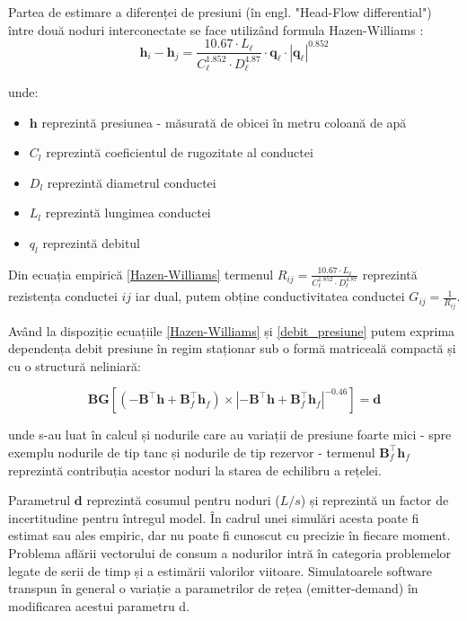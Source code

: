 Partea de estimare a diferenței de presiuni (în engl. "Head-Flow differential") între două noduri interconectate se face utilizând formula Hazen-Williams \cite{sanz2016demand}:
\begin{equation}
\label{debit_presiune}
\mathbf h_i-\mathbf h_j=\frac{10.67\cdot L_\ell}{C_\ell^{1.852}\cdot D_\ell^{4.87}}\cdot \mathbf q_\ell\cdot |\mathbf q_\ell|^{0.852}
\end{equation}

unde:
\begin{itemize}
\label{Hazen-Williams}
\item $\textbf{h}$ reprezintă presiunea - măsurată de obicei în metru coloană de apă
\item $C_l$  reprezintă coeficientul de rugozitate al conductei
\item $D_l$ reprezintă diametrul conductei
\item $L_l$ reprezintă lungimea conductei
\item $q_l$ reprezintă debitul
\end{itemize}

Din ecuația empirică \eqref{Hazen-Williams} termenul $R_{ij}=\frac{10.67\cdot L_\ell}{C_\ell^{1.852}\cdot D_\ell^{4.87}}$ reprezintă rezistența conductei $ij$ iar dual, putem obține conductivitatea conductei $G_{ij} = \frac{1}{R_{ij}}$.

Având la dispoziție ecuațiile \eqref{Hazen-Williams} și \eqref{debit_presiune} putem exprima dependența debit presiune în regim staționar sub o formă matriceală compactă și cu o structură neliniară:

\begin{equation}
\label{eq:HW-matrix}
\mathbf B\mathbf G\left[\left(-\mathbf B^\top \mathbf h+\mathbf B_f^\top \mathbf h_f\right)\times \left|-\mathbf B^\top \mathbf h+\mathbf B_f^\top \mathbf h_f\right|^{-0.46}\right]=\mathbf d
\end{equation}


\noindent unde s-au luat în calcul și nodurile care au variații de presiune foarte mici - spre exemplu nodurile de tip tanc și  nodurile de tip rezervor - termenul $\mathbf B_f^\top \mathbf h_f$ reprezintă contribuția acestor noduri la starea de echilibru a rețelei.

Parametrul $\mathbf{d}$ reprezintă cosumul pentru noduri ($L/s$) și reprezintă un factor de incertitudine pentru întregul model. În cadrul unei simulări acesta poate fi estimat sau ales empiric, dar nu poate fi cunoscut cu precizie în fiecare moment. Problema aflării vectorului de consum a nodurilor intră în categoria problemelor legate de serii de timp și a estimării valorilor viitoare. Simulatoarele software transpun în general o variație a parametrilor de rețea (emitter-demand) în modificarea acestui parametru d.

